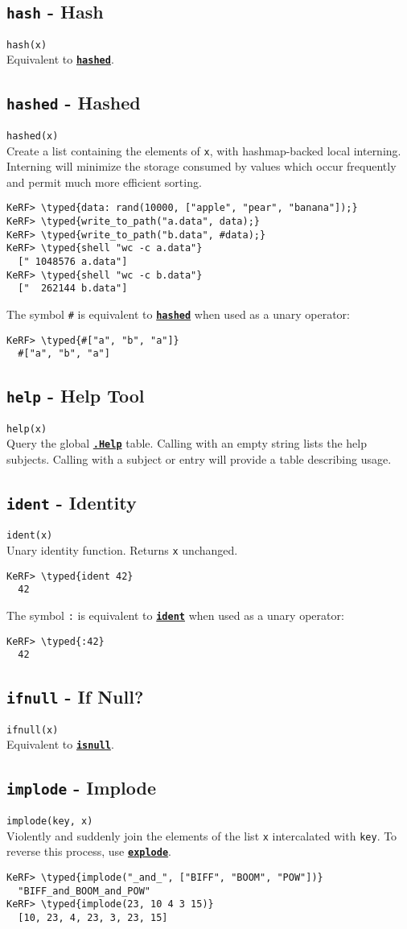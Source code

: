\documentclass{article}
\newcommand{\typed}[1]{\textcolor{TealBlue}{#1}}
\newcommand{\primdefu}[3]{\subsection{\texttt{#1} - #2}\label{prim:#3}}
\newcommand{\primu}[2]{\hyperref[prim:#2]{\textbf{\texttt{#1}}}}
\newcommand{\primdef}[2]{\primdefu{#1}{#2}{#1}}
\newcommand{\prim}[1]{\primu{#1}{#1}}
\newcommand{\const}[2]{\hyperref[const:#2]{\textbf{\texttt{#1}}}}
\begin{document}
\primdef{hash}{Hash}
\texttt{hash(x)}\\

Equivalent to \prim{hashed}.

\primdef{hashed}{Hashed}
\texttt{hashed(x)}\\

Create a list containing the elements of \texttt{x}, with hashmap-backed local interning. Interning will minimize the storage consumed by values which occur frequently and permit much more efficient sorting.
\begin{Verbatim}
KeRF> \typed{data: rand(10000, ["apple", "pear", "banana"]);}
KeRF> \typed{write_to_path("a.data", data);}
KeRF> \typed{write_to_path("b.data", #data);}
KeRF> \typed{shell "wc -c a.data"}
  [" 1048576 a.data"]
KeRF> \typed{shell "wc -c b.data"}
  ["  262144 b.data"]
\end{Verbatim}

The symbol \texttt{\#} is equivalent to \prim{hashed} when used as a unary operator:
\begin{Verbatim}
KeRF> \typed{#["a", "b", "a"]}
  #["a", "b", "a"]
\end{Verbatim}

\primdef{help}{Help Tool}\label{subsec:help}
\texttt{help(x)}\\

Query the global \const{.Help}{help} table. Calling with an empty string lists the help subjects. Calling with a subject or entry will provide a table describing usage.

\primdef{ident}{Identity}
\texttt{ident(x)}\\

Unary identity function. Returns \texttt{x} unchanged.
\begin{Verbatim}
KeRF> \typed{ident 42}
  42
\end{Verbatim}

The symbol \texttt{:} is equivalent to \prim{ident} when used as a unary operator:
\begin{Verbatim}
KeRF> \typed{:42}
  42
\end{Verbatim}

\primdef{ifnull}{If Null?}
\texttt{ifnull(x)}\\

Equivalent to \prim{isnull}.

\primdef{implode}{Implode}
\texttt{implode(key, x)}\\

Violently and suddenly join the elements of the list \texttt{x} intercalated with \texttt{key}. To reverse this process, use \prim{explode}.
\begin{Verbatim}
KeRF> \typed{implode("_and_", ["BIFF", "BOOM", "POW"])}
  "BIFF_and_BOOM_and_POW"
KeRF> \typed{implode(23, 10 4 3 15)}
  [10, 23, 4, 23, 3, 23, 15]
\end{Verbatim}
\end{document}
